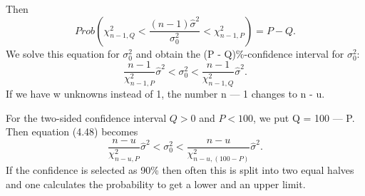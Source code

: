 	Then
	\begin{equation*}
	Prob(\chi^2_{n-1,Q}<\frac{(n-1)\hat{\sigma}^2}{\sigma^2_0}<\chi^2_{n-1,P})=P-Q.
	\end{equation*}
	We solve this equation for $\sigma^2_0$ and obtain the (P - Q)\%-confidence interval for $\sigma^2_0$:
	\begin{equation}
	\frac{n-1}{\chi^2_{n-1,P}}\hat{\sigma}^2<\sigma^2_0<\frac{n-1}{\chi^2_{n-1,Q}}\hat{\sigma}^2.
	\end{equation}
	If we have w unknowns instead of 1, the number n — 1 changes to n - u.
	
	For the two-sided confidence interval $Q > 0$ and $P < 100$, we put Q = 100 — P.
	Then equation (4.48) becomes
	\begin{equation}
	\frac{n-u}{\chi^2_{n-u,P}}\hat{\sigma}^2<\sigma^2_0<\frac{n-u}{\chi^2_{n-u,(100-P)}}\hat{\sigma}^2.
	\end{equation}
	If the confidence is selected as 90\% then often this is split into two equal halves and one
	calculates the probability to get a lower and an upper limit.
